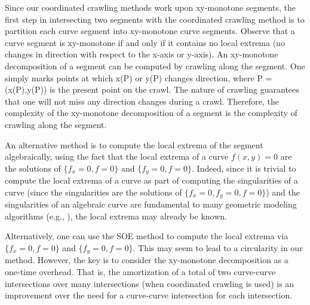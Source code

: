 Since our coordinated crawling methods work upon xy-monotone segments,
the first step in intersecting two segments with the coordinated crawling method is to
partition each curve segment into xy-monotone curve segments.
Observe that a curve segment is xy-monotone if and only if it contains 
no local extrema (no changes in direction with respect to the x-axis or y-axis).
An xy-monotone decomposition of a segment can be computed by crawling along the segment.
One simply marks points at which x(P) or y(P) changes direction,
where P = (x(P),y(P)) is the present point on the crawl.
The nature of crawling guarantees that one will not miss any direction changes during a crawl.
Therefore, the complexity of the xy-monotone decomposition of a segment is the
complexity of crawling along the segment.

An alternative method is to compute the local extrema of the segment algebraically,
using the fact that the local extrema of a curve $f(x,y)=0$ are the solutions of
$\{f_{x}=0,f=0\}$ and \mbox{$\{f_{y}=0,f=0\}$}.
Indeed, since it is trivial to compute the local extrema of a curve as part of computing
the singularities of a curve (since the singularities are the solutions of 
\mbox{$\{f_{x}=0,f_{y}=0,f=0\}$}) and the singularities of an algebraic curve are fundamental to
many geometric modeling algorithms (e.g., \cite{abba,johnstone87}),
the local extrema may already be known.



Alternatively, one can use the SOE method to compute the local extrema via 
$\{f_{x}=0,f=0\}$ and $\{f_{y}=0,f=0\}$.
This may seem to lead to a circularity in our method.
However, the key is to consider the xy-monotone decomposition as a one-time overhead.
That is, the amortization of a total of two curve-curve intersections over many intersections 
(when coordinated crawling is used) is
an improvement over the need for a curve-curve intersection for each intersection.

